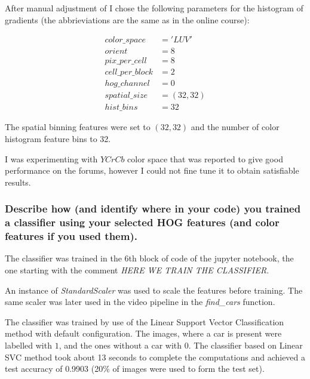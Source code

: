 \documentclass[a4paper,10pt]{article}
\begin{document}
After manual adjustment of 
I chose the following parameters for the histogram of gradients (the abbrieviations are the same as in the online course):

\begin{align*}
color\_space &= 'LUV' \\
orient &= 8 \\
pix\_per\_cell &= 8 \\
cell\_per\_block &= 2 \\
hog\_channel &= 0 \\
spatial\_size &= (32, 32) \\
hist\_bins &= 32 
\end{align*}

The spatial binning features were set to $(32,32)$
and the number of color histogram feature bins to 32.

I was experimenting with $YCrCb$ color space that was reported to give good performance on the forums,
however I could not fine tune it to obtain satisfiable results.

\subsubsection{Describe how (and identify where in your code) you trained a classifier using your selected HOG features (and color features if you used them).}

The classifier was trained in the 6th block of code of the jupyter notebook,
the one starting with the comment \emph{HERE WE TRAIN THE CLASSIFIER}.

An instance of \emph{StandardScaler} was used to scale the features before training.
The same scaler was later used in the video pipeline in the \emph{find\_cars} function.

The classifier was trained by use of the Linear Support Vector Classification method with default configuration.
The images, where a car is present were labelled with $1$, and the ones without a car with $0$.
The classifier based on Linear SVC method took about 13 seconds to complete the computations and achieved a test accuracy of 0.9903
(20\% of images were used to form the test set).



\end{document}
